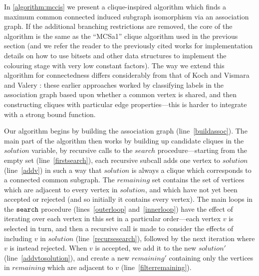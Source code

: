 \documentclass{llncs}
\newcommand{\lineref}[1]{line~\ref{#1}}
\newcommand{\twolinesref}[2]{lines~\ref{#1} and~\ref{#2}}
\begin{document}
In \cref{algorithm:mccis} we present a clique-inspired algorithm which finds a maximum common
connected induced subgraph isomorphism via an association graph. If the additional branching
restrictions are removed, the core of the algorithm is the same as the ``MCSa1'' clique algorithm
used in the previous section (and we refer the reader to the previously cited works for
implementation details on how to use bitsets and other data structures to implement the colouring
stage with very low constant factors). The way we extend this algorithm for connectedness differs
considerably from that of Koch \cite{DBLP:journals/tcs/Koch01} and Vismara and Valery
\cite{DBLP:conf/mco/VismaraV08}: these earlier approaches worked by classifying labels in the
association graph based upon whether a common vertex is shared, and then constructing cliques with
particular edge properties---this is harder to integrate with a strong bound function.

Our algorithm begins by building the association graph (\lineref{buildassoc}). The main part of the algorithm
then works by building up candidate cliques in the $\mathit{solution}$ variable, by recursive calls
to the $\mathit{search}$ procedure---starting from the empty set (\lineref{firstsearch}), each
recursive subcall adds one vertex to $\mathit{solution}$ (\lineref{addv}) in such a way that
$\mathit{solution}$ is always a clique which corresponds to a connected common subgraph. The
$\mathit{remaining}$ set contains the set of vertices which are adjacent to every vertex in
$\mathit{solution}$, and which have not yet been accepted or rejected (and so initially it contains
every vertex). The main loops in the $\FuncSty{search}$ procedure
(\twolinesref{outerloop}{innerloop}) have the effect of iterating over each vertex in this set in a
particular order---each vertex $v$ is selected in turn, and then a recursive call is made to
consider the effects of including $v$ in $\mathit{solution}$ (\lineref{recursesearch}), followed by
the next iteration where $v$ is instead rejected. When $v$ is accepted, we add it to the new
$\mathit{solution'}$ (\lineref{addvtosolution}), and create a new $\mathit{remaining'}$ containing
only the vertices in $\mathit{remaining}$ which are adjacent to $v$ (\lineref{filterremaining}).
\end{document}
